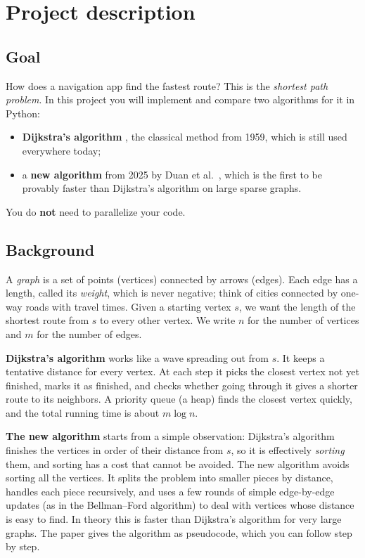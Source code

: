 \documentclass[11pt,a4paper]{article}
\begin{document}
\section*{Project description}

\subsection*{Goal}
How does a navigation app find the fastest route? This is the
\emph{shortest path problem}. In this project you will implement and compare
two algorithms for it in Python:
\begin{itemize}
  \item \textbf{Dijkstra's algorithm} \cite{dijkstra}, the classical method
        from 1959, which is still used everywhere today;
  \item a \textbf{new algorithm} from 2025 by Duan et al.\ \cite{duan}, which
        is the first to be provably faster than Dijkstra's algorithm on large
        sparse graphs.
\end{itemize}
You do \textbf{not} need to parallelize your code.

\subsection*{Background}
A \emph{graph} is a set of points (vertices) connected by arrows (edges).
Each edge has a length, called its \emph{weight}, which is never negative; think
of cities connected by one-way roads with travel times. Given a starting
vertex $s$, we want the length of the shortest route from $s$ to every other
vertex. We write $n$ for the number of vertices and $m$ for the number of
edges.

\textbf{Dijkstra's algorithm} works like a wave spreading out from $s$. It
keeps a tentative distance for every vertex. At each step it picks the
closest vertex not yet finished, marks it as finished, and checks whether
going through it gives a shorter route to its neighbors. A priority queue
(a heap) finds the closest vertex quickly, and the total running time is
about $m \log n$.

\textbf{The new algorithm} \cite{duan} starts from a simple observation:
Dijkstra's algorithm finishes the vertices in order of their distance from
$s$, so it is effectively \emph{sorting} them, and sorting has a cost that
cannot be avoided. The new algorithm avoids sorting all the vertices. It
splits the problem into smaller pieces by distance, handles each piece
recursively, and uses a few rounds of simple edge-by-edge updates (as in the
Bellman--Ford algorithm) to deal with vertices whose distance is easy to find. In theory this is faster than Dijkstra's
algorithm for very large graphs. The paper gives the algorithm as pseudocode,
which you can follow step by step.
\end{document}
